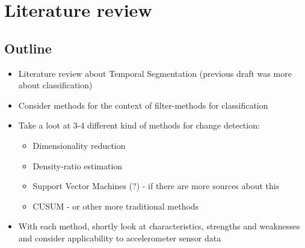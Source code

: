 
\chapter{Literature review}

\label{Chapter2} %


\section{Outline}
\begin{itemize}
  \item Literature review about Temporal Segmentation (previous draft was more about classification)
  \item Consider methods for the context of filter-methods for classification
  \item Take a loot at 3-4 different kind of methods for change detection:
    \begin{itemize}
      \item Dimensionality reduction
      \item Density-ratio estimation
      \item Support Vector Machines (?) - if there are more sources about this
      \item CUSUM - or other more traditional methods
    \end{itemize}
  \item With each method, shortly look at characteristics, strengths and weaknesses and consider applicability to accelerometer sensor data
\end{itemize}
